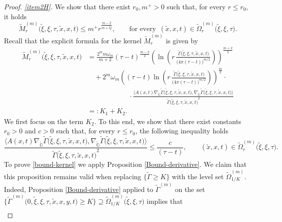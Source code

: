 \documentclass[10pt,a4paper]{amsart}
\def \G {{\Gamma}}
\def \GG {{\mathbb{G}}}
\def \O {{\Omega}}
\def \t {{\tau}}
\def \tt {\tilde}
\def \x {{\xi}}
\begin{document}
\begin{proof}
	
	\medskip
	\emph{\ref{item2H}.} We show that there exist $r_0,m^+>0$ such that, for every $r\leq r_0$, it holds 
	\begin{equation}
		\tt M_{ r}^{(m)}\big(\tt \x,\x,\t,\tt x,x,t\big)\leq m^+ r^{\frac{m-2}{m+\tt Q}},\qquad \text{for every }\, (\tt x, x,t)\in \tt \O^{(m)}_{r}\big(\tt \x, \x, \t\big).
	\end{equation}
	Recall that the explicit formula for the kernel $\tt M_{ r}^{(m)}$ is given by 
	\begin{equation}\label{kernel-formula}
		\begin{aligned}
			\tt M_{ r}^{(m)}\big(\tt \x,\x,\t,\tt x, x,t\big)&=\frac{2^{m} m\omega_m}{m+2}(\t-t)^\frac{m-2}{2}\left(\ln\left( r\, \frac{\tt \Gamma\big(\tt \x, \x, \t,\tt x, x,t\big)}{\big( 4\pi(\t-t)\big)^{m/2}} \right)\right)^\frac{m+2}{2}\\
			&\quad+2^m \omega_m \left((\t-t)\ln\left( r\, \frac{\tt \Gamma\big(\tt \x, \x, \t,\tt x, x,t\big)}{\big( 4\pi(\t-t)\big)^{m/2}} \right)\right)^\frac{m}{2}\cdot\\
			&\qquad\qquad \qquad \cdot\frac{\langle A(x,t)\nabla_{\tt \GG} \tt \Gamma\big(\tt \x, \x, \t,\tt x, x,t\big),\nabla_{\tt \GG}\tt \Gamma\big(\tt \x, \x, \t,\tt x, x,t\big) \rangle}{{\tt \Gamma\big(\tt \x, \x, \t,\tt x, x,t\big)}^2}\\
			&=:K_1+K_2.
		\end{aligned}
	\end{equation}
	We first focus on the term $K_2$. To this end, we show that there exist constants $r_0>0$ and $c>0$ such that, for every $r\leq r_0$, the following inequality holds 
	\begin{equation}\label{bound-kernel}
		\frac{\langle A(x,t)\nabla_{\tt \GG} \tt \Gamma\big(\tt \x, \x, \t,\tt x, x,t\big),\nabla_{\tt \GG}\tt \Gamma\big(\tt \x,\x, \t,\tt x, x,t\big) \rangle}{{\tt \Gamma\big(\tt \x, \x, \t,\tt x, x,t\big)}^2}\leq \frac{c}{(\t-t)},\qquad (\tt x, x,t)\in \tt \O^{(m)}_{r}\big(\tt \x, \x, \t\big).
	\end{equation}
	To prove \eqref{bound-kernel} we apply Proposition \ref{Bound-derivative}.  We claim that this proposition remains valid when replacing  $\big\{\tt\G\geq K\big\}$  with the level set $\tt\Omega_{1/K}^{(m)}$. Indeed, Proposition \ref{Bound-derivative} applied to  $\tt \G^{(m)}$ on the set $\Big\{\tt\G^{(m)}(0,\tt \x,\x,\t,\tt x,x,y,t\Big)\geq K\big\}\supseteq\tt\Omega_{1/K}^{(m)}\big(\tt \x,\x,\t\big)$ implies that
	\begin{equation}
		\begin{aligned}

\end{aligned}
\end{equation}
\end{proof}
\end{document}
